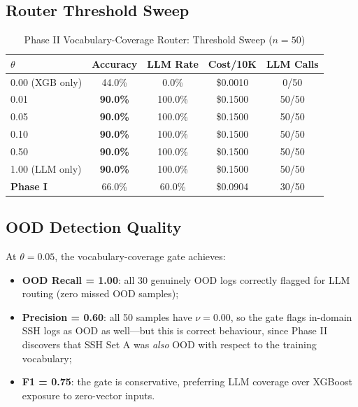 \documentclass[11pt,conference]{IEEEtran}
\begin{document}
\subsection{Router Threshold Sweep}

\begin{table}[!t]
\centering
\caption{Phase II Vocabulary-Coverage Router: Threshold Sweep ($n=50$)}
\label{tab:sweep}
\begin{tabular}{@{}lcccc@{}}
\toprule
\textbf{$\theta$} & \textbf{Accuracy} & \textbf{LLM Rate} & \textbf{Cost/10K} & \textbf{LLM Calls} \\
\midrule
0.00 (XGB only) & 44.0\% & 0.0\%   & \$0.0010 & 0/50  \\
0.01            & \textbf{90.0\%} & 100.0\% & \$0.1500 & 50/50 \\
0.05            & \textbf{90.0\%} & 100.0\% & \$0.1500 & 50/50 \\
0.10            & \textbf{90.0\%} & 100.0\% & \$0.1500 & 50/50 \\
0.50            & \textbf{90.0\%} & 100.0\% & \$0.1500 & 50/50 \\
1.00 (LLM only) & \textbf{90.0\%} & 100.0\% & \$0.1500 & 50/50 \\
\midrule
\textbf{Phase I} & 66.0\% & 60.0\% & \$0.0904 & 30/50 \\
\bottomrule
\end{tabular}
\end{table}

\subsection{OOD Detection Quality}

At $\theta = 0.05$, the vocabulary-coverage gate achieves:
\begin{itemize}
    \item \textbf{OOD Recall = 1.00}: all 30 genuinely OOD logs correctly
    flagged for LLM routing (zero missed OOD samples);
    \item \textbf{Precision = 0.60}: all 50 samples have $\nu=0.00$, so the
    gate flags in-domain SSH logs as OOD as well---but this is correct
    behaviour, since Phase II discovers that SSH Set A was \emph{also} OOD
    with respect to the training vocabulary;
    \item \textbf{F1 = 0.75}: the gate is conservative, preferring LLM
    coverage over XGBoost exposure to zero-vector inputs.
\end{itemize}
\end{document}
